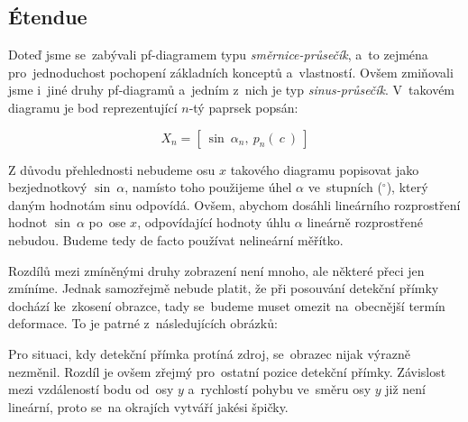 

\subsection{Étendue}

Doteď jsme se~zabývali pf-diagramem typu \emph{směrnice-průsečík}, a~to zejména pro~jednoduchost pochopení základních konceptů a~vlastností. Ovšem zmiňovali jsme i~jiné druhy pf-diagramů a~jedním z~nich je typ \emph{sinus-průsečík}. V~takovém diagramu je bod reprezentující $n$-tý paprsek popsán:

\[ X_n = [\ \sin\ \alpha_n,\ p_n(\ c\ )\ ] \]

Z důvodu přehlednosti nebudeme osu $x$ takového diagramu popisovat jako bezjednotkový $\sin\ \alpha$, namísto toho použijeme úhel $\alpha$ ve~stupních ($^{\circ}$), který daným hodnotám sinu odpovídá. Ovšem, abychom dosáhli lineárního rozprostření hodnot $\sin\ \alpha$ po~ose $x$, odpovídající hodnoty úhlu $\alpha$ lineárně rozprostřené nebudou. Budeme tedy de facto používat nelineární měřítko.

Rozdílů mezi zmíněnými druhy zobrazení není mnoho, ale některé přeci jen zmíníme. Jednak samozřejmě nebude platit, že při posouvání detekční přímky dochází ke~zkosení obrazce, tady se~budeme muset omezit na~obecnější termín deformace. To je patrné z~následujících obrázků:


Pro situaci, kdy detekční přímka protíná zdroj, se~obrazec nijak výrazně nezměnil. Rozdíl je ovšem zřejmý pro~ostatní pozice detekční přímky. Závislost mezi vzdáleností bodu od~osy $y$ a~rychlostí pohybu ve~směru osy $y$ již není lineární, proto se~na okrajích vytváří jakési špičky.

